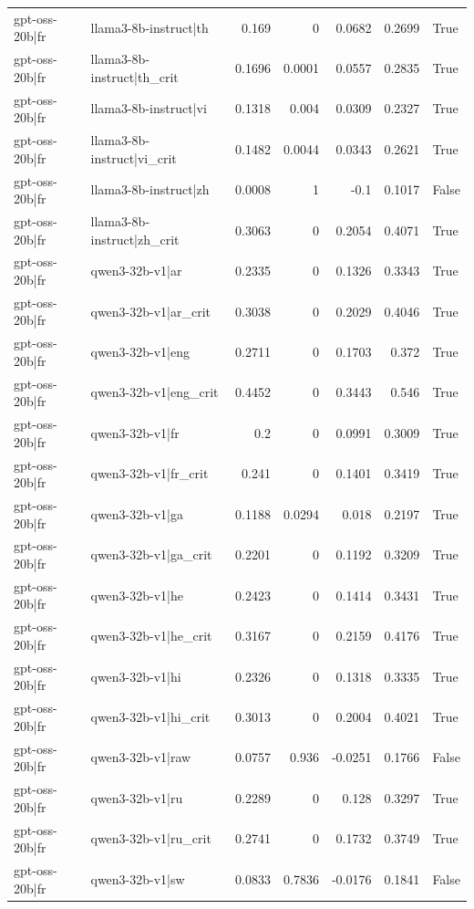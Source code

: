 \begin{table}
\begin{tabular}{l l r r r r l}
gpt-oss-20b|fr & llama3-8b-instruct|th & 0.169 & 0 & 0.0682 & 0.2699 & True \\
gpt-oss-20b|fr & llama3-8b-instruct|th_crit & 0.1696 & 0.0001 & 0.0557 & 0.2835 & True \\
gpt-oss-20b|fr & llama3-8b-instruct|vi & 0.1318 & 0.004 & 0.0309 & 0.2327 & True \\
gpt-oss-20b|fr & llama3-8b-instruct|vi_crit & 0.1482 & 0.0044 & 0.0343 & 0.2621 & True \\
gpt-oss-20b|fr & llama3-8b-instruct|zh & 0.0008 & 1 & -0.1 & 0.1017 & False \\
gpt-oss-20b|fr & llama3-8b-instruct|zh_crit & 0.3063 & 0 & 0.2054 & 0.4071 & True \\
gpt-oss-20b|fr & qwen3-32b-v1|ar & 0.2335 & 0 & 0.1326 & 0.3343 & True \\
gpt-oss-20b|fr & qwen3-32b-v1|ar_crit & 0.3038 & 0 & 0.2029 & 0.4046 & True \\
gpt-oss-20b|fr & qwen3-32b-v1|eng & 0.2711 & 0 & 0.1703 & 0.372 & True \\
gpt-oss-20b|fr & qwen3-32b-v1|eng_crit & 0.4452 & 0 & 0.3443 & 0.546 & True \\
gpt-oss-20b|fr & qwen3-32b-v1|fr & 0.2 & 0 & 0.0991 & 0.3009 & True \\
gpt-oss-20b|fr & qwen3-32b-v1|fr_crit & 0.241 & 0 & 0.1401 & 0.3419 & True \\
gpt-oss-20b|fr & qwen3-32b-v1|ga & 0.1188 & 0.0294 & 0.018 & 0.2197 & True \\
gpt-oss-20b|fr & qwen3-32b-v1|ga_crit & 0.2201 & 0 & 0.1192 & 0.3209 & True \\
gpt-oss-20b|fr & qwen3-32b-v1|he & 0.2423 & 0 & 0.1414 & 0.3431 & True \\
gpt-oss-20b|fr & qwen3-32b-v1|he_crit & 0.3167 & 0 & 0.2159 & 0.4176 & True \\
gpt-oss-20b|fr & qwen3-32b-v1|hi & 0.2326 & 0 & 0.1318 & 0.3335 & True \\
gpt-oss-20b|fr & qwen3-32b-v1|hi_crit & 0.3013 & 0 & 0.2004 & 0.4021 & True \\
gpt-oss-20b|fr & qwen3-32b-v1|raw & 0.0757 & 0.936 & -0.0251 & 0.1766 & False \\
gpt-oss-20b|fr & qwen3-32b-v1|ru & 0.2289 & 0 & 0.128 & 0.3297 & True \\
gpt-oss-20b|fr & qwen3-32b-v1|ru_crit & 0.2741 & 0 & 0.1732 & 0.3749 & True \\
gpt-oss-20b|fr & qwen3-32b-v1|sw & 0.0833 & 0.7836 & -0.0176 & 0.1841 & False \\

\end{tabular}
\end{table}
